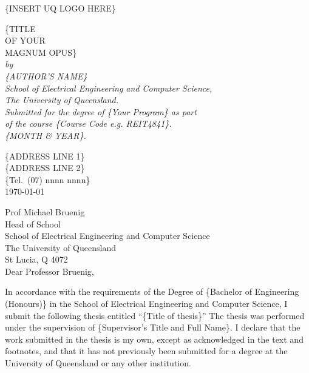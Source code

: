 \documentclass[12pt,openany,a4paper]{book}
\renewcommand{\baselinestretch}{1.2}	%
\begin{document}
\begin{titlepage}
\renewcommand{\baselinestretch}{1.0}
\begin{center}
\vspace*{35mm}
\Huge\bf
		
        \{INSERT UQ LOGO HERE\} \\ 
        \vspace*{25mm}
        
        \{TITLE\\
		OF YOUR\\
		MAGNUM OPUS\}\\
\vspace{20mm}
\large\sl
		by\\
		\{AUTHOR'S NAME\}
		\medskip\\
\rm
		School of Electrical Engineering and Computer Science,\\
		The University of Queensland.\\
\vspace{30mm}
		Submitted for the degree of \{Your Program\} as part\\
        of the course \{Course Code e.g. REIT4841\}.
		\bigskip\\
\large
		\{MONTH \& YEAR\}.		
\end{center}
\end{titlepage}

\cleardoublepage

\begin{flushright}
	\{ADDRESS LINE 1\}\\
	\{ADDRESS LINE 2\}\\
	\{Tel.\ (07) nnnn nnnn\}\\
	\medskip
	\today
\end{flushright}
\begin{flushleft}
  Prof Michael Bruenig\\
  Head of School\\
  School of Electrical Engineering and Computer Science\\
  The University of Queensland\\
  St Lucia, Q 4072\\
  \bigskip\bigskip
  Dear Professor Bruenig,
\end{flushleft}

In accordance with the requirements of the Degree of \{Bachelor of Engineering (Honours)\} in the School of Electrical Engineering and Computer Science, I submit the following thesis entitled
“\{Title of thesis\}”
The thesis was performed under the supervision of \{Supervisor’s Title and Full Name\}. I declare that the work submitted in the thesis is my own, except as acknowledged in the text and footnotes, and that it has not previously been submitted for a degree at the University of Queensland or any other institution.
\end{document}
